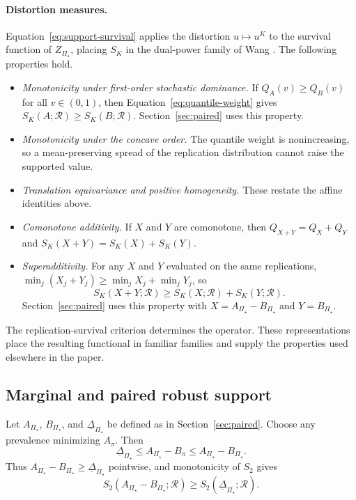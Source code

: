 \documentclass[11pt]{article}
\newcommand{\Regime}{\mathcal{R}}
\newcommand{\PSet}{\Pi_\star}
\newcommand{\RobDelta}{\underline{\Delta}_{\PSet}}
\theoremstyle{remark}
\begin{document}
\paragraph{Distortion measures.}
Equation~\eqref{eq:support-survival} applies the distortion $u\mapsto u^{K}$ to the survival function of $Z_{\PSet}$, placing $S_K$ in the dual-power family of Wang \cite{wang1996premium}. The following properties hold.

\begin{itemize}
\item \emph{Monotonicity under first-order stochastic dominance.} If $Q_A(v)\geq Q_B(v)$ for all $v\in(0,1)$, then Equation~\eqref{eq:quantile-weight} gives $S_K(A;\Regime)\geq S_K(B;\Regime)$. Section~\ref{sec:paired} uses this property.
\item \emph{Monotonicity under the concave order.} The quantile weight is nonincreasing, so a mean-preserving spread of the replication distribution cannot raise the supported value.
\item \emph{Translation equivariance and positive homogeneity.} These restate the affine identities above.
\item \emph{Comonotone additivity.} If $X$ and $Y$ are comonotone, then $Q_{X+Y}=Q_X+Q_Y$ and $S_K(X+Y)=S_K(X)+S_K(Y)$.
\item \emph{Superadditivity.} For any $X$ and $Y$ evaluated on the same replications, $\min_j(X_j+Y_j)\geq\min_jX_j+\min_jY_j$, so
\[
S_K(X+Y;\Regime)
\geq
S_K(X;\Regime)+S_K(Y;\Regime).
\]
Section~\ref{sec:paired} uses this property with $X=A_{\PSet}-B_{\PSet}$ and $Y=B_{\PSet}$.
\end{itemize}

The replication-survival criterion determines the operator. These representations place the resulting functional in familiar families and supply the properties used elsewhere in the paper.

\subsection{Marginal and paired robust support}

Let $A_{\PSet}$, $B_{\PSet}$, and $\RobDelta$ be defined as in Section~\ref{sec:paired}. Choose any prevalence minimizing $A_\pi$. Then
\[
\RobDelta
\leq
A_{\PSet}-B_\pi
\leq
A_{\PSet}-B_{\PSet}.
\]
Thus $A_{\PSet}-B_{\PSet}\geq\RobDelta$ pointwise, and monotonicity of $S_2$ gives
\[
S_2(A_{\PSet}-B_{\PSet};\Regime)
\geq
S_2(\RobDelta;\Regime).
\]
\end{document}
